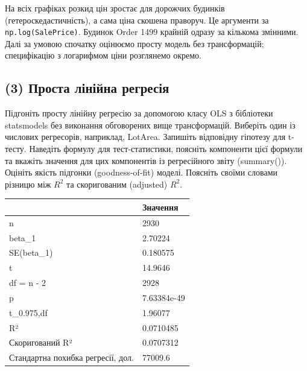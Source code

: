 На всіх графіках розкид цін зростає для дорожчих будинків
(гетероскедастичність), а сама ціна скошена праворуч. Це аргументи за
\texttt{np.log(SalePrice)}. Будинок Order 1499 крайній одразу за
кількома змінними. Далі за умовою спочатку оцінюємо просту модель без
трансформацій; специфікацію з логарифмом ціни розглянемо окремо.


\Needspace{225.0pt}

\subsection{(3) Проста лінійна регресія}

\begin{taskstatement}
Підгоніть просту лінійну регресію за допомогою класу OLS з бібліотеки
statsmodels без виконання обговорених вище трансформацій. Виберіть один
із числових регресорів, наприклад, LotArea. Запишіть відповідну гіпотезу
для t-тесту. Наведіть формулу для тест-статистики, поясніть компоненти
цієї формули та вкажіть значення для цих компонентів із регресійного
звіту (summary()). Оцініть якість підгонки (goodness-of-fit) моделі.
Поясніть своїми словами різницю між \(R^2\) та скоригованим (adjusted)
\(R^2\).
\end{taskstatement}



\Needspace{258.4pt}


\begingroup\fontsize{7.5}{9.5}\selectfont\setlength{\tabcolsep}{2.5mm}\renewcommand{\arraystretch}{1.15}
\par\vspace{2pt}\noindent\begin{tabular}{|ll|}
\hline
 & Значення \\
\hline
n & 2930 \\
beta\_1 & 2.70224 \\
SE(beta\_1) & 0.180575 \\
t & 14.9646 \\
df = n - 2 & 2928 \\
p & 7.63384e-49 \\
t\_0.975,df & 1.96077 \\
R² & 0.0710485 \\
Скоригований R² & 0.0707312 \\
Стандартна похибка регресії, дол. & 77009.6 \\
\hline
\end{tabular}\par\vspace{2pt}
\endgroup


